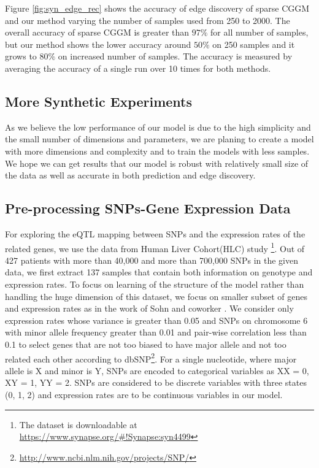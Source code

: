 \documentclass{article}
\begin{document}
Figure \ref{fig:syn_edge_rec} shows the accuracy of edge discovery of sparse CGGM and our method varying the number of samples used from 250 to 2000. The overall accuracy of sparse CGGM is greater than $97\%$ for all number of samples, but our method shows the lower accuracy  around $50\%$ on 250 samples and it grows to $80\%$ on increased number of samples. The accuracy is measured by averaging the accuracy of a single run over 10 times for both methods.

\subsection{More Synthetic Experiments}
As we believe the low performance of our model is due to the high simplicity and the small number of dimensions and parameters, we are planing to create a model with more dimensions and complexity and to train the models with less samples. We hope we can get results that our model is robust with relatively small size of the data as well as accurate in both prediction and edge discovery.

\subsection{Pre-processing SNPs-Gene Expression Data}
For exploring the eQTL mapping between SNPs and the expression rates of the related genes, we use the data from Human Liver Cohort(HLC) study \cite{schadt2008mapping} \footnote{The dataset is downloadable at \url{ https://www.synapse.org/\#!Synapse:syn4499}}. Out of 427 patients with more than 40,000 and more than 700,000 SNPs in the given data, we first extract 137 samples that contain both information on genotype and expression rates. To  focus on learning of the structure of the model rather than handling the huge dimension of this dataset, we focus on smaller subset of genes and expression rates as in the work of Sohn and coworker \cite{sohn2012joint}. We consider only expression rates whose variance is greater than 0.05 and SNPs on chromosome 6 with minor allele frequency greater than 0.01 and pair-wise correlation less than 0.1 to select genes that are not too biased to have major allele and not too related each other according to dbSNP\footnote{\url{http://www.ncbi.nlm.nih.gov/projects/SNP/}}. For a single nucleotide, where major allele is X and minor is Y, SNPs are encoded to categorical variables as XX = 0, XY = 1, YY = 2. SNPs are considered to be discrete variables with three states (0, 1, 2) and expression rates are to be continuous variables in our model.
 
\end{document}
